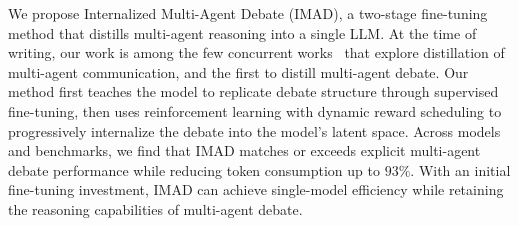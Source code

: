 \documentclass[11pt]{article}
\begin{document}



We propose Internalized Multi-Agent Debate (IMAD), a two-stage fine-tuning method that distills multi-agent reasoning into a single LLM.
At the time of writing, our work is among the few concurrent works~\cite{li2025chain, luo2026agentark} that explore distillation of multi-agent communication, and the first to distill multi-agent debate.
Our method first teaches the model to replicate debate structure through supervised fine-tuning, then uses reinforcement learning with dynamic reward scheduling to progressively internalize the debate into the model's latent space. 
Across models and benchmarks, we find that IMAD matches or exceeds explicit multi-agent debate performance while reducing token consumption up to $93\%$.
With an initial fine-tuning investment, IMAD can achieve single-model efficiency while retaining the reasoning capabilities of multi-agent debate. 
\end{document}
